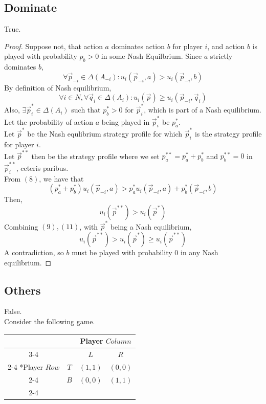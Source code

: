 \subsection{Dominate}
True.\\
\begin{proof}
Suppose not, that action $a$ dominates action $b$ for player $i$,
and action $b$ is played with probability $p_b>0$ in some Nash Equilbrium.
Since $a$ strictly dominates $b$,
\begin{equation}
    \forall \vec{p}_{-i}\in\Delta(A_{-i}): 
    u_i(\vec{p}_{-i},a)> u_i(\vec{p}_{-i},b)
\end{equation}
By definition of Nash equilibrium,
\begin{equation}
    \forall i\in N,\forall \vec{q}_i\in\Delta(A_i):
    u_i(\vec{p})\geq u_i(\vec{p}_{-i},\vec{q}_i)
\end{equation}
Also, $\exists \vec{p}_i^*\in\Delta(A_i)$ 
such that $p_b^* > 0$ for $\vec{p}_i^*$, which is part of a Nash equilibrium.
Let the probability of action $a$ being played in $\vec{p}_i^*$ be $p_a^*$.\\
Let $\vec{p}^*$ be the Nash equlibrium strategy profile for which 
$\vec{p}_i^*$ is the strategy profile for player $i$.\\
Let $\vec{p}^{**}$ then be the strategy profile where we set
$p_a^{**}=p_a^*+p_b^*$ and $p_b^{**}=0$ in $\vec{p}_i^{**}$, ceteris paribus.\\
From $(8)$, we have that
\begin{equation}
    (p_a^*+p_b^*)u_i(\vec{p}_{-i},a) 
    > p_a^* u_i(\vec{p}_{-i},a) + p_b^* (\vec{p}_{-i},b)
\end{equation}
Then,
\begin{equation}
    u_i(\vec{p}^{**}) > u_i(\vec{p}^*)
\end{equation}
Combining $(9),(11)$, with $\vec{p}^*$ being a Nash equilibrium,
\begin{equation}
    u_i(\vec{p}^{**}) > u_i(\vec{p}^*) \geq u_i(\vec{p}^{**})
\end{equation}
A contradiction, so $b$ must be played with probability 0 
in any Nash equilibrium.
\end{proof}

\subsection{Others}
False.\\
Consider the following game.
\begin{table}[h]
\setlength{\extrarowheight}{2pt}
\begin{tabular}{*{4}{c|}}
    \multicolumn{2}{c}{} & \multicolumn{2}{c}{Player $Column$}\\\cline{3-4}
    \multicolumn{1}{c}{} &  & $L$  & $R$ \\\cline{2-4}
    \multirow{2}*{Player $Row$}  & $T$ & $(1,1)$ & $(0,0)$ \\\cline{2-4}
    & $B$ & $(0,0)$ & $(1,1)$ \\\cline{2-4}
\end{tabular}
\end{table}

